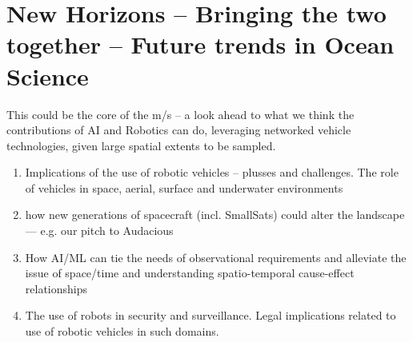 \section{New Horizons -- Bringing the two together -- Future trends in Ocean Science}

This could be the core of the m/s -- a look ahead to what we think the
contributions of AI and Robotics can do, leveraging networked vehicle
technologies, given large spatial extents to be sampled. 

\begin{enumerate} 

\item Implications of the use of robotic vehicles -- plusses and
  challenges. The role of vehicles in space, aerial, surface and
  underwater environments

\item how new generations of spacecraft (incl. SmallSats) could alter
  the landscape — e.g. our pitch to Audacious
  
\item How AI/ML can tie the needs of observational requirements and
  alleviate the issue of space/time and understanding spatio-temporal
  cause-effect relationships

\item The use of robots in security and surveillance. Legal implications
  related to use of robotic vehicles in such domains. 

\end{enumerate}

